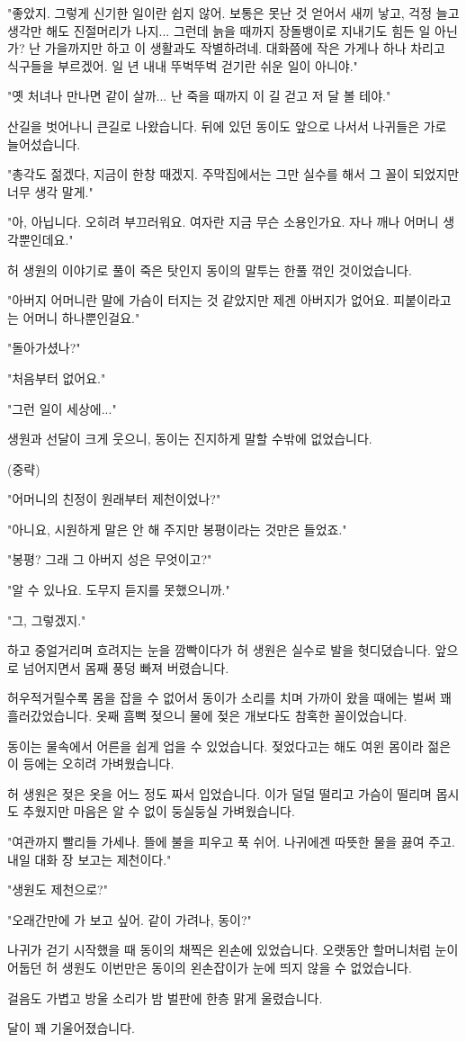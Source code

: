\documentclass[fs85,seriesRus]{korfarm-base}
\begin{document}
{"좋았지. 그렇게 신기한 일이란 쉽지 않어. 보통은 못난 것 얻어서 새끼 낳고, 걱정 늘고 생각만 해도 진절머리가 나지... 그런데 늙을 때까지 장돌뱅이로 지내기도 힘든 일 아닌가? 난 가을까지만 하고 이 생활과도 작별하려네. 대화쯤에 작은 가게나 하나 차리고 식구들을 부르겠어. 일 년 내내 뚜벅뚜벅 걷기란 쉬운 일이 아니야."

"옛 처녀나 만나면 같이 살까... 난 죽을 때까지 이 길 걷고 저 달 볼 테야."

산길을 벗어나니 큰길로 나왔습니다. 뒤에 있던 동이도 앞으로 나서서 나귀들은 가로 늘어섰습니다.

"총각도 젊겠다, 지금이 한창 때겠지. 주막집에서는 그만 실수를 해서 그 꼴이 되었지만 너무 생각 말게."

"아, 아닙니다. 오히려 부끄러워요. 여자란 지금 무슨 소용인가요. 자나 깨나 어머니 생각뿐인데요."

허 생원의 이야기로 풀이 죽은 탓인지 동이의 말투는 한풀 꺾인 것이었습니다.

"아버지 어머니란 말에 가슴이 터지는 것 같았지만 제겐 아버지가 없어요. 피붙이라고는 어머니 하나뿐인걸요."

"돌아가셨나?" 

"처음부터 없어요." 

"그런 일이 세상에..."

생원과 선달이 크게 웃으니, 동이는 진지하게 말할 수밖에 없었습니다.

(중략)

"어머니의 친정이 원래부터 제천이었나?"

"아니요, 시원하게 말은 안 해 주지만 봉평이라는 것만은 들었죠."

"봉평? 그래 그 아버지 성은 무엇이고?"

"알 수 있나요. 도무지 듣지를 못했으니까."

"그, 그렇겠지."

하고 중얼거리며 흐려지는 눈을 깜빡이다가 허 생원은 실수로 발을 헛디뎠습니다. 앞으로 넘어지면서 몸째 풍덩 빠져 버렸습니다.

허우적거릴수록 몸을 잡을 수 없어서 동이가 소리를 치며 가까이 왔을 때에는 벌써 꽤 흘러갔었습니다. 옷째 흠뻑 젖으니 물에 젖은 개보다도 참혹한 꼴이었습니다.

동이는 물속에서 어른을 쉽게 업을 수 있었습니다. 젖었다고는 해도 여윈 몸이라 젊은이 등에는 오히려 가벼웠습니다.

허 생원은 젖은 옷을 어느 정도 짜서 입었습니다. 이가 덜덜 떨리고 가슴이 떨리며 몹시도 추웠지만 마음은 알 수 없이 둥실둥실 가벼웠습니다.

"여관까지 빨리들 가세나. 뜰에 불을 피우고 푹 쉬어. 나귀에겐 따뜻한 물을 끓여 주고. 내일 대화 장 보고는 제천이다."

"생원도 제천으로?"

"오래간만에 가 보고 싶어. 같이 가려나, 동이?"

나귀가 걷기 시작했을 때 동이의 채찍은 왼손에 있었습니다. 오랫동안 할머니처럼 눈이 어둡던 허 생원도 이번만은 동이의 왼손잡이가 눈에 띄지 않을 수 없었습니다.

걸음도 가볍고 방울 소리가 밤 벌판에 한층 맑게 울렸습니다.

달이 꽤 기울어졌습니다.
}
\end{document}
